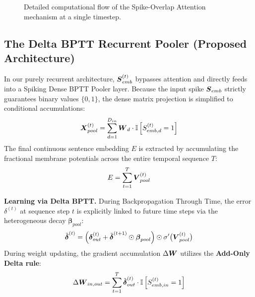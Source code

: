 \documentclass[10pt,journal,compsoc]{IEEEtran}
\begin{document}
\begin{figure}[t!]
\begin{center}
{%
}
\end{center}
\caption{Detailed computational flow of the Spike-Overlap Attention mechanism at a single timestep.}
\label{fig:attention_mech}
\end{figure}

\subsection{The Delta BPTT Recurrent Pooler (Proposed Architecture)}
In our purely recurrent architecture, $\boldsymbol{S}_{emb}^{(t)}$ bypasses attention and directly feeds into a Spiking Dense BPTT Pooler layer. Because the input spike $\boldsymbol{S}_{emb}$ strictly guarantees binary values $\{0, 1\}$, the dense matrix projection is simplified to conditional accumulations:
\begin{equation}
\boldsymbol{X}_{pool}^{(t)} = \sum_{d=1}^{D_{in}} \boldsymbol{W}_{d} \cdot \mathbb{I}\left[ S_{emb, d}^{(t)} = 1 \right]
\end{equation}
The final continuous sentence embedding $E$ is extracted by accumulating the fractional membrane potentials across the entire temporal sequence $T$:
\begin{equation}
E = \sum_{t=1}^T \boldsymbol{V}_{pool}^{(t)}
\end{equation}

\textbf{Learning via Delta BPTT.} During Backpropagation Through Time, the error $\delta^{(t)}$ at sequence step $t$ is explicitly linked to future time steps via the heterogeneous decay $\bm{\beta}_{pool}$:
\begin{equation}
\tilde{\boldsymbol{\delta}}^{(t)} = \left( \boldsymbol{\delta}_{out}^{(t)} + \tilde{\boldsymbol{\delta}}^{(t+1)} \odot \boldsymbol{\beta}_{pool} \right) \odot \sigma'\big(\boldsymbol{V}_{pool}^{(t)}\big)
\end{equation}
During weight updating, the gradient accumulation $\Delta \boldsymbol{W}$ utilizes the \textbf{Add-Only Delta rule}:
\begin{equation}
\Delta \boldsymbol{W}_{in, out} = \sum_{t=1}^{T} \tilde{\boldsymbol{\delta}}^{(t)}_{out} \cdot \mathbb{I}\left[ S_{emb, in}^{(t)} = 1 \right]
\end{equation}
\end{document}

